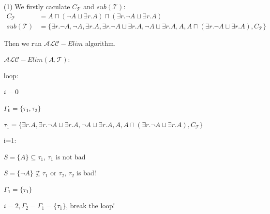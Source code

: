 \documentclass[12pt]{article}
\def \ALC {\mathcal{ALC}}
\def \T {\mathcal{T}}
\begin{document}
    \begin{enumerate}
        \item [(1)]
        We firstly caculate $C_{\T}$ and $sub(\T)$:
        \begin{align*}
            C_{\T} &= A \sqcap(\neg A \sqcup \exists r. A) \sqcap (\exists r.\neg A \sqcup \exists r.A) \\
            sub(\T) &= \{\exists r.\neg A, \neg A,\exists r.A, \exists r.\neg A\sqcup \exists r.A, \neg A \sqcup \exists r.A, A, A \sqcap(\exists r.\neg A \sqcup \exists r. A),C_{\T}\}
        \end{align*} \par
        Then we run $\ALC-Elim$ algorithm. \par
        $\ALC-Elim(A,\T)$: \par
        \quad loop:

        \qquad $i=0$ \par
        \qquad $\varGamma_0=\{\tau_1,\tau_2\}$ \par
        \qquad $\tau_1 =\{\exists r.A, \exists r.\neg A\sqcup \exists r.A, \neg A \sqcup \exists r.A, A, A \sqcap(\exists r.\neg A \sqcup \exists r. A),C_{\T}\}$ \par
        \qquad i=1:

    \qquad $S = \{A\} \subseteq \tau_1$, $\tau_1$ is not bad

    \qquad $S = \{\neg A\} \not \subseteq \tau_1$ or $\tau_2$, $\tau_2$ is bad!

    \qquad $\varGamma_1 = \{\tau_1\}$

    \qquad $i=2,\varGamma_2 = \varGamma_1 = \{\tau_1\}$, break the loop! 
    

\end{enumerate}
\end{document}
